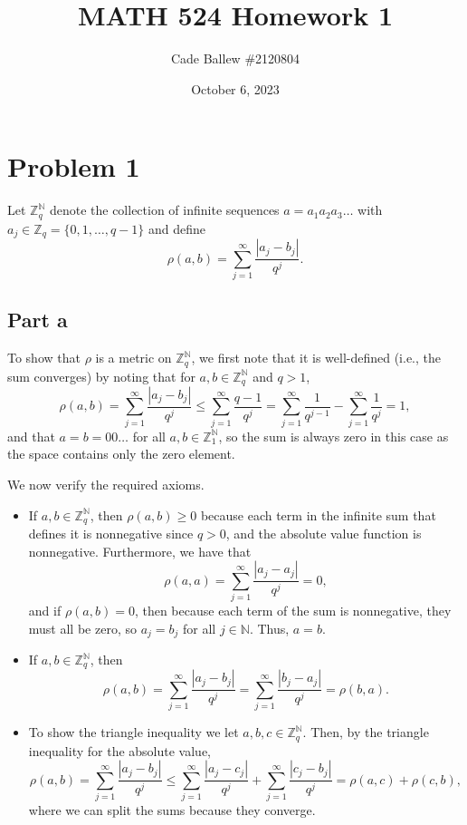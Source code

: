 \documentclass{article}
\title{MATH 524 Homework 1}
\author{Cade Ballew \#2120804}
\date{October 6, 2023}
\begin{document}
	
\maketitle
	
\section{Problem 1}
Let $\mathbb{Z}^\mathbb{N}_q$ denote the collection of infinite sequences $a=a_1a_2a_3\ldots$ with $a_j\in\mathbb{Z}_q=\{0,1,\ldots,q-1\}$ and define
\[
\rho(a,b)=\sum_{j=1}^\infty\frac{|a_j-b_j|}{q^j}.
\]
\subsection{Part a}
To show that $\rho$ is a metric on $\mathbb{Z}^\mathbb{N}_q$, we first note that it is well-defined (i.e., the sum converges) by noting that for $a,b\in\mathbb{Z}^\mathbb{N}_q$ and $q>1$,
\[
\rho(a,b)=\sum_{j=1}^\infty\frac{|a_j-b_j|}{q^j}\leq\sum_{j=1}^\infty\frac{q-1}{q^j}=\sum_{j=1}^\infty\frac{1}{q^{j-1}}-\sum_{j=1}^\infty\frac{1}{q^{j}}=1,
\]
and that $a=b=00\ldots$ for all $a,b\in\mathbb{Z}^\mathbb{N}_1$, so the sum is always zero in this case as the space contains only the zero element.

We now verify the required axioms.
\begin{itemize}
	\item If $a,b\in\mathbb{Z}^\mathbb{N}_q$, then $\rho(a,b)\geq0$ because each term in the infinite sum that defines it is nonnegative since $q>0$, and the absolute value function is nonnegative. Furthermore, we have that
	\[
	\rho(a,a)=\sum_{j=1}^\infty\frac{|a_j-a_j|}{q^j}=0,
	\]
	and if $\rho(a,b)=0$, then because each term of the sum is nonnegative, they must all be zero, so $a_j=b_j$ for all $j\in\mathbb{N}$. Thus, $a=b$.
	\item If $a,b\in\mathbb{Z}^\mathbb{N}_q$, then
	\[
	\rho(a,b)=\sum_{j=1}^\infty\frac{|a_j-b_j|}{q^j}=\sum_{j=1}^\infty\frac{|b_j-a_j|}{q^j}=\rho(b,a).
	\]
	\item To show the triangle inequality we let $a,b,c\in\mathbb{Z}^\mathbb{N}_q$. Then, by the triangle inequality for the absolute value,
	\[
	\rho(a,b)=\sum_{j=1}^\infty\frac{|a_j-b_j|}{q^j}\leq\sum_{j=1}^\infty\frac{|a_j-c_j|}{q^j}+\sum_{j=1}^\infty\frac{|c_j-b_j|}{q^j}=\rho(a,c)+\rho(c,b),
	\]
	where we can split the sums because they converge.
\end{itemize}
\end{document}
